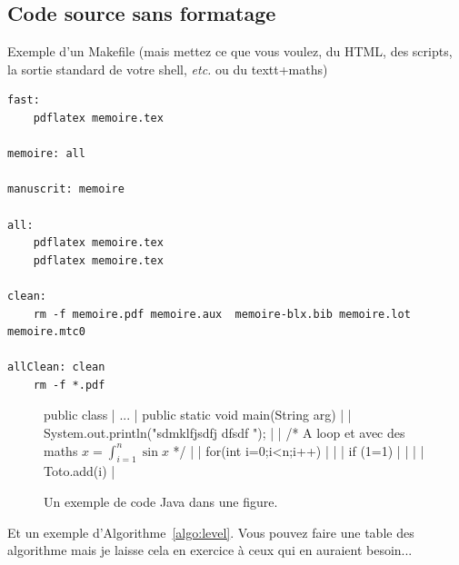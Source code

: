 \lipsum[12]

\subsection{Code source sans formatage}

\lipsum[13]

Exemple d'un Makefile (mais mettez ce que vous voulez, du HTML, des scripts, la sortie
standard de votre shell, {\it etc.} ou du textt+maths)
\begin{codeExample}
\begin{small}
\begin{verbatim}
fast:
	pdflatex memoire.tex

memoire: all

manuscrit: memoire

all:
	pdflatex memoire.tex
	pdflatex memoire.tex

clean:
	rm -f memoire.pdf memoire.aux  memoire-blx.bib memoire.lot memoire.mtc0 	

allClean: clean
	rm -f *.pdf
\end{verbatim}
\end{small}
\end{codeExample}

\lipsum[14]

\lipsum[15]

\begin{figure}[!t]
\begin{code}
\begin{java}
public class {
|	...
|	public static void main(String arg){
|	|	System.out.println("sdmklfjsdfj dfsdf ");
|	|	/* A loop et avec des maths $x=\int_{i=1}^n \sin{x}$ */
|	|	for(int i=0;i<n;i++)
|	|	|	if (1=1)
|	|	|	|	Toto.add(i)
|	}
}
\end{java}
\end{code}
\caption{Un exemple de code Java dans une figure.}
\label{fig:code1}
\end{figure}

Et un exemple d'Algorithme~\ref{algo:level}. Vous pouvez faire une table des algorithme mais je laisse cela en exercice à ceux qui en auraient besoin...

